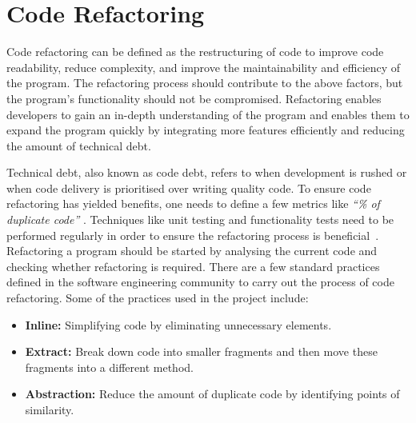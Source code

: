 \newpage
\section{Code Refactoring}
\label{refactortechs}
Code refactoring can be defined as the restructuring of code to improve code readability, reduce complexity, and improve the 
maintainability and efficiency of the program. The refactoring process should contribute to the above factors, 
but the program's functionality should not be compromised. Refactoring enables developers to gain an in-depth understanding of 
the program and enables them to expand the program quickly by integrating more features efficiently and reducing the amount 
of technical debt.

\noindent Technical debt, also known as code debt, refers to when development is rushed or when code delivery is prioritised over 
writing quality code. To ensure code refactoring has yielded benefits, one needs to define a few metrics like \textit{``\% of duplicate code''} \cite{ThePower10:online}. 
Techniques like unit testing and functionality tests need to be performed regularly in order to ensure the refactoring process is beneficial~\cite{TheCompl71:online}. 
Refactoring a program should be started by analysing the current code and checking whether refactoring is required. 
There are a few standard practices defined in the software engineering community to carry out the process of code refactoring. 
Some of the practices used in the project include:
\begin{itemize}
    \item \textbf{Inline:} Simplifying code by eliminating unnecessary elements. 
    \item \textbf{Extract:} Break down code into smaller fragments and then move these fragments into a different method. 
    \item \textbf{Abstraction:} Reduce the amount of duplicate code by identifying points of similarity. \cite{refactoring}  
\end{itemize}
